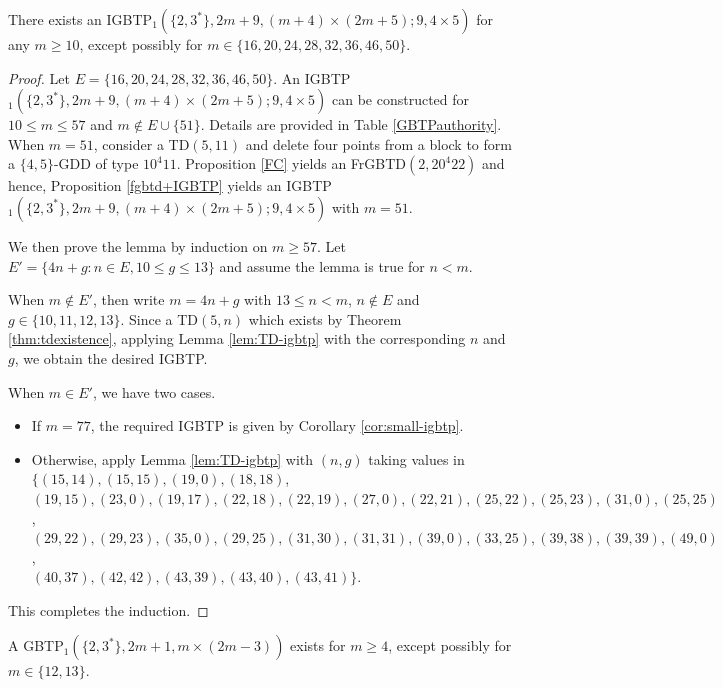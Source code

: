 \documentclass[draft, 11pt]{article}
\begin{document}
 \begin{lemma}
 \label{lem:IGBTP}There exists an IGBTP$_1(\{2,3^*\},2m+9,(m+4)\times (2m+5);9,4\times 5)$
 for any  $m\geq 10$, except possibly for $m\in\{16,20,24,28,32,36,46,50\}$.
 \end{lemma}

 \begin{proof}
 Let $E=\{16,20,24,28,32,36,46,50\}$.
 An IGBTP$_1(\{2,3^*\},2m+9,(m+4)\times(2m+5); 9,4\times 5)$ can be constructed for $10\le m\le 57$ and $m\notin E \cup\{51\}$. 
 Details are provided in Table \ref{GBTPauthority}.
 When $m=51$, consider a TD$(5,11)$ and delete four points from a block to form a $\{4,5\}$-GDD of type $10^4 11$. 
 Proposition \ref{FC} yields an FrGBTD$(2,20^4 22)$ and hence, Proposition \ref{fgbtd+IGBTP} yields 
 an IGBTP$_1(\{2,3^*\},2m+9,(m+4)\times(2m+5); 9,4\times 5)$ with $m=51$.

We then prove the lemma by induction on $m \ge 57$.
Let $E'=\{4n+g: n\in E, 10\le g\le 13\}$ and assume the lemma is true for $n<m$.
 
When $m\notin E'$, then write $m=4n+g$ with $13\le n< m$, $n\notin E$ and $g\in\{10,11,12,13\}$.  
 Since a TD$(5,n)$ which exists by Theorem \ref{thm:tdexistence}, applying Lemma \ref{lem:TD-igbtp} with 
 the corresponding $n$ and $g$, we obtain the desired IGBTP.
 
When $m\in E'$, we have two cases.
\begin{itemize}
\item If $m=77$, the required IGBTP is given by Corollary \ref{cor:small-igbtp}.
\item Otherwise, apply Lemma \ref{lem:TD-igbtp} 
with $(n,g)$ taking values in $\{(15, 14), (15, 15),(19, 0), (18, 18)$, \\ 
$(19, 15), (23, 0), (19, 17), (22, 18), (22, 19), (27, 0), (22, 21), (25, 22), (25, 23), (31, 0), (25,25)$, \\
$(29, 22), (29, 23), (35, 0), (29, 25), (31, 30), (31, 31), (39, 0),(33, 25), (39, 38), (39, 39), (49, 0)$, \\
$(40, 37), (42, 42), (43, 39), (43, 40), (43, 41)\}$.
\end{itemize}
This completes the induction.
 \end{proof}
 
 
 
 \begin{lemma}
 \label{lem:GBTP} A GBTP$_1(\{2, 3^* \}, 2m + 1, m \times (2m - 3))$ exists for $m\ge 4$, except possibly for $m\in\{12,13\}$. 
 \end{lemma}
\end{document}
